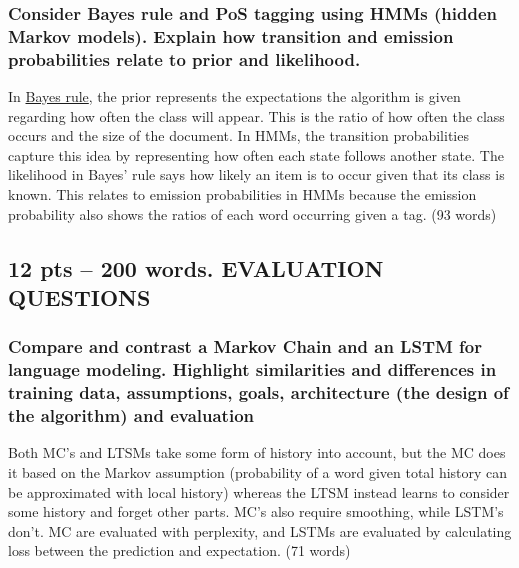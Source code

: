 \documentclass[
  11pt,
  british,
]{article}
\begin{document}
\hypertarget{consider-bayes-rule-and-pos-tagging-using-hmms-hidden-markov-models.-explain-how-transition-and-emission-probabilities-relate-to-prior-and-likelihood.}{%
\subsubsection{Consider Bayes rule and PoS tagging using HMMs (hidden
Markov models). Explain how transition and emission probabilities relate
to prior and
likelihood.}\label{consider-bayes-rule-and-pos-tagging-using-hmms-hidden-markov-models.-explain-how-transition-and-emission-probabilities-relate-to-prior-and-likelihood.}}

In \href{../Classification/Native\%20baiyes/Bayes\%20rule.md}{Bayes
rule}, the prior represents the expectations the algorithm is given
regarding how often the class will appear. This is the ratio of how
often the class occurs and the size of the document. In HMMs, the
transition probabilities capture this idea by representing how often
each state follows another state. The likelihood in Bayes' rule says how
likely an item is to occur given that its class is known. This relates
to emission probabilities in HMMs because the emission probability also
shows the ratios of each word occurring given a tag. (93 words)

\hypertarget{pts-200-words.-evaluation-questions}{%
\subsection{12 pts -- 200 words. EVALUATION
QUESTIONS}\label{pts-200-words.-evaluation-questions}}

\hypertarget{compare-and-contrast-a-markov-chain-and-an-lstm-for-language-modeling.-highlight-similarities-and-differences-in-training-data-assumptions-goals-architecture-the-design-of-the-algorithm-and-evaluation}{%
\subsubsection{Compare and contrast a Markov Chain and an LSTM for
language modeling. Highlight similarities and differences in training
data, assumptions, goals, architecture (the design of the algorithm) and
evaluation}\label{compare-and-contrast-a-markov-chain-and-an-lstm-for-language-modeling.-highlight-similarities-and-differences-in-training-data-assumptions-goals-architecture-the-design-of-the-algorithm-and-evaluation}}

Both MC's and LTSMs take some form of history into account, but the MC
does it based on the Markov assumption (probability of a word given
total history can be approximated with local history) whereas the LTSM
instead learns to consider some history and forget other parts. MC's
also require smoothing, while LSTM's don't. MC are evaluated with
perplexity, and LSTMs are evaluated by calculating loss between the
prediction and expectation. (71 words)
\end{document}
